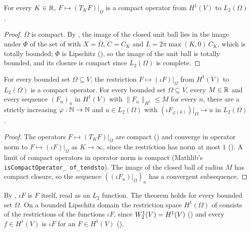\begin{proposition}
\label{prop:truncation-compact}
\leanok
{}
For every $K \in \mathbb{R}$, $F \mapsto (T_K F)|_\Omega$ is a compact operator from $H^1(V)$ to
$L_2(\Omega)$.
\end{proposition}

\begin{proof}
\leanok
$\overline \Omega$ is compact. By , the image of the
closed unit ball lies in the image under $\Phi$ of the set of 
with $X = \overline \Omega$, $C = C_K$ and $L = 2 \pi \max(K, 0) \, C_K$, which is totally
bounded; $\Phi$ is Lipschitz (), so the image of the unit ball is
totally bounded, and its closure is compact since $L_2(\Omega)$ is complete.
\end{proof}

\begin{theorem}
\label{thm:rellich-compactness}
\leanok
{}
For every bounded set $\Omega \subseteq V$, the restriction $F \mapsto (\iota F)|_\Omega$ from
$H^1(V)$ to $L_2(\Omega)$ is a compact operator. For every bounded set $\Omega \subseteq V$, every
$M \in \mathbb{R}$ and every sequence $(F_n)_n$ in $H^1(V)$ with $\|F_n\|_{H^1} \leq M$ for every $n$,
there are a strictly increasing $\varphi : \mathbb{N} \to \mathbb{N}$ and $u \in L_2(\Omega)$ with
$(\iota F_{\varphi(k)})|_\Omega \to u$ in $L_2(\Omega)$.
\end{theorem}

\begin{proof}
\leanok
The operators $F \mapsto (T_K F)|_\Omega$ are compact () and
converge in operator norm to $F \mapsto (\iota F)|_\Omega$ as $K \to \infty$, since the
restriction has norm at most $1$ (). A limit of compact
operators in operator norm is compact (Mathlib's \texttt{isCompactOperator\_\allowbreak
of\_\allowbreak tendsto}). The image of the closed ball of radius $M$ has compact closure, so the
sequence $((\iota F_n)|_\Omega)_n$ has a convergent subsequence.
\end{proof}

By , $\iota F$ is $F$ itself, read as an $L_2$ function. The theorem
holds for every bounded set $\Omega$. On a bounded Lipschitz domain the restriction space
$H^1(\Omega)$ of  consists of the restrictions of the
functions $\iota F$, since $W^{1}_{2}(V) = H^1(V)$ () and every
$f \in H^1(V)$ is $\iota F$ for an $F \in H^1(V)$ ().

